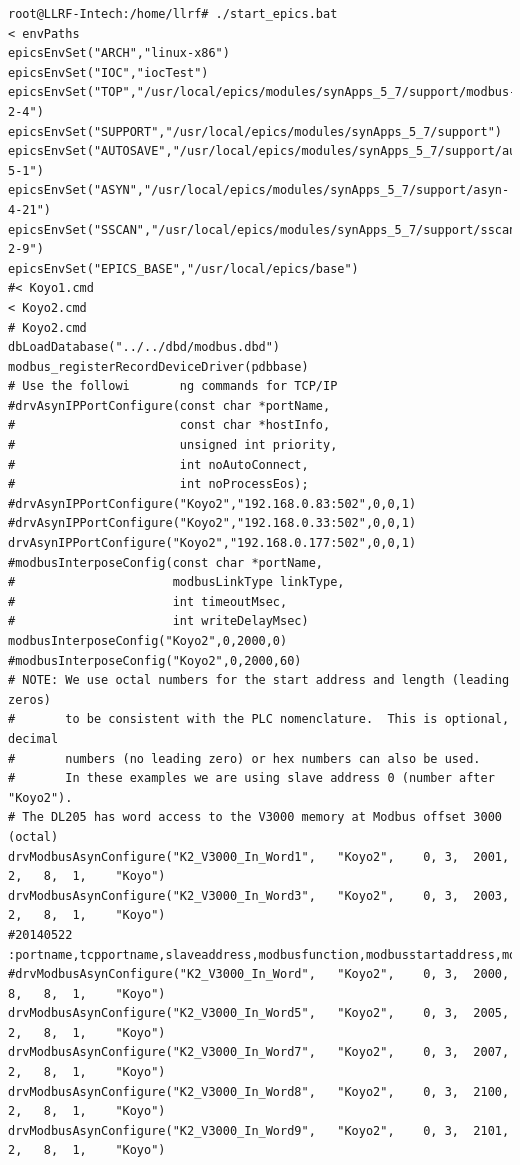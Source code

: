 \documentclass[11pt
  , a4paper
  , article
  , oneside
]{memoir}
\begin{document}
\begin{lstlisting}[style=termstyle]
root@LLRF-Intech:/home/llrf# ./start_epics.bat 
< envPaths
epicsEnvSet("ARCH","linux-x86")
epicsEnvSet("IOC","iocTest")
epicsEnvSet("TOP","/usr/local/epics/modules/synApps_5_7/support/modbus-2-4")
epicsEnvSet("SUPPORT","/usr/local/epics/modules/synApps_5_7/support")
epicsEnvSet("AUTOSAVE","/usr/local/epics/modules/synApps_5_7/support/autosave-5-1")
epicsEnvSet("ASYN","/usr/local/epics/modules/synApps_5_7/support/asyn-4-21")
epicsEnvSet("SSCAN","/usr/local/epics/modules/synApps_5_7/support/sscan-2-9")
epicsEnvSet("EPICS_BASE","/usr/local/epics/base")
#< Koyo1.cmd
< Koyo2.cmd
# Koyo2.cmd
dbLoadDatabase("../../dbd/modbus.dbd")
modbus_registerRecordDeviceDriver(pdbbase)
# Use the followi       ng commands for TCP/IP
#drvAsynIPPortConfigure(const char *portName,
#                       const char *hostInfo,
#                       unsigned int priority,
#                       int noAutoConnect,
#                       int noProcessEos);
#drvAsynIPPortConfigure("Koyo2","192.168.0.83:502",0,0,1)
#drvAsynIPPortConfigure("Koyo2","192.168.0.33:502",0,0,1)
drvAsynIPPortConfigure("Koyo2","192.168.0.177:502",0,0,1)
#modbusInterposeConfig(const char *portName,
#                      modbusLinkType linkType,
#                      int timeoutMsec, 
#                      int writeDelayMsec)
modbusInterposeConfig("Koyo2",0,2000,0)
#modbusInterposeConfig("Koyo2",0,2000,60)
# NOTE: We use octal numbers for the start address and length (leading zeros)
#       to be consistent with the PLC nomenclature.  This is optional, decimal
#       numbers (no leading zero) or hex numbers can also be used.
#       In these examples we are using slave address 0 (number after "Koyo2").
# The DL205 has word access to the V3000 memory at Modbus offset 3000 (octal)
drvModbusAsynConfigure("K2_V3000_In_Word1",   "Koyo2",    0, 3,  2001,  2,   8,  1,    "Koyo")
drvModbusAsynConfigure("K2_V3000_In_Word3",   "Koyo2",    0, 3,  2003,  2,   8,  1,    "Koyo")
#20140522 :portname,tcpportname,slaveaddress,modbusfunction,modbusstartaddress,modbuslength,datatype,pollmsec,plctype
#drvModbusAsynConfigure("K2_V3000_In_Word",   "Koyo2",    0, 3,  2000,  8,   8,  1,    "Koyo")
drvModbusAsynConfigure("K2_V3000_In_Word5",   "Koyo2",    0, 3,  2005,  2,   8,  1,    "Koyo")
drvModbusAsynConfigure("K2_V3000_In_Word7",   "Koyo2",    0, 3,  2007,  2,   8,  1,    "Koyo")
drvModbusAsynConfigure("K2_V3000_In_Word8",   "Koyo2",    0, 3,  2100,  2,   8,  1,    "Koyo")
drvModbusAsynConfigure("K2_V3000_In_Word9",   "Koyo2",    0, 3,  2101,  2,   8,  1,    "Koyo")

\end{lstlisting}
\end{document}
